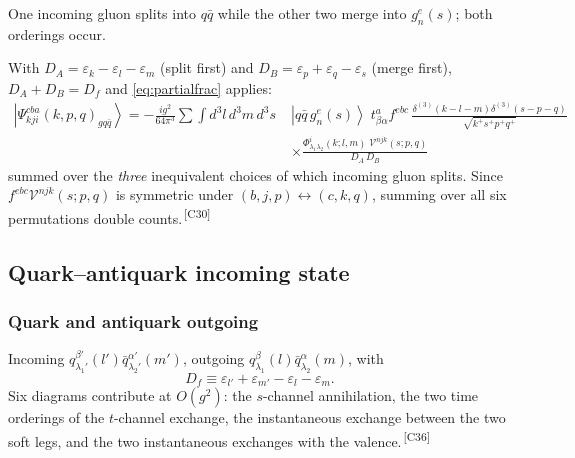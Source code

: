 \documentclass[11pt]{article}
\newcommand{\eps}{\varepsilon}
\newcommand{\dthree}{\delta^{(3)}}
\newcommand{\ket}[1]{\left|#1\right\rangle}
\newcommand{\Ph}{\Phi}
\newcommand{\Vg}{\mathcal{V}}
\newcommand{\qk}[3]{q^{#1}_{#2}(#3)}
\newcommand{\aqk}[3]{\bar q^{#1}_{#2}(#3)}
\newcommand{\gl}[3]{g^{#1}_{#2}(#3)}
\newcommand{\chg}[1]{{\color{blue!70!black}\textsuperscript{\,[C#1]}}}
\begin{document}
One incoming gluon splits into $q\bar q$ while the other two merge into $\gl{e}{n}{s}$; both
orderings occur.
\begin{center}
\end{center}
With $D_{A}=\eps_{k}-\eps_{l}-\eps_{m}$ (split first) and $D_{B}=\eps_{p}+\eps_{q}-\eps_{s}$
(merge first), $D_{A}+D_{B}=D_{f}$ and \eqref{eq:partialfrac} applies:
\begin{align}
\ket{\Psi^{cba}_{kji}(k,p,q)_{gq\bar q}}=-\frac{ig^{2}}{64\pi^{3}}
\sum\int\!d^{3}l\,d^{3}m\,d^{3}s\;
&\ket{q\bar q\,\gl{e}{n}{s}}\;t^{a}_{\beta\alpha}f^{ebc}\,
\frac{\dthree(k-l-m)\dthree(s-p-q)}{\sqrt{k^{+}s^{+}p^{+}q^{+}}}
\nonumber\\&\times
\frac{\Ph^{i}_{\lambda_{1}\lambda_{2}}(k;l,m)\;\Vg^{njk}(s;p,q)}{D_{A}\,D_{B}}
\label{eq:Pgqq}
\end{align}
summed over the \emph{three} inequivalent choices of which incoming gluon splits. Since
$f^{ebc}\Vg^{njk}(s;p,q)$ is symmetric under $(b,j,p)\leftrightarrow(c,k,q)$, summing over all six
permutations double counts.\chg{30}

\subsection{Quark--antiquark incoming state}
\subsubsection{Quark and antiquark outgoing}

Incoming $\qk{\beta'}{\lambda_{1}'}{l'}\aqk{\alpha'}{\lambda_{2}'}{m'}$, outgoing
$\qk{\beta}{\lambda_{1}}{l}\aqk{\alpha}{\lambda_{2}}{m}$, with
\begin{equation}
D_{f}\equiv\eps_{l'}+\eps_{m'}-\eps_{l}-\eps_{m}.
\end{equation}
Six diagrams contribute at $O(g^{2})$: the $s$-channel annihilation, the two time orderings of the
$t$-channel exchange, the instantaneous exchange between the two soft legs, and the two
instantaneous exchanges with the valence.\chg{36}
\end{document}
